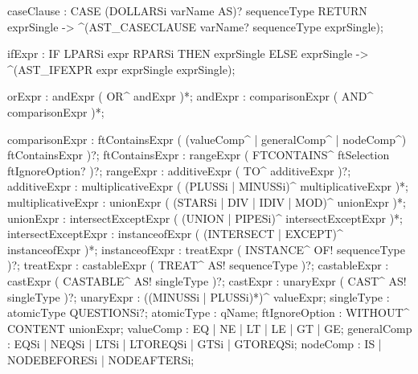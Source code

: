     caseClause : CASE (DOLLARSi varName AS)? sequenceType RETURN exprSingle
                -> ^(AST_CASECLAUSE varName? sequenceType exprSingle);

  ifExpr : IF LPARSi expr RPARSi THEN exprSingle ELSE exprSingle
           -> ^(AST_IFEXPR expr exprSingle exprSingle);

  orExpr : andExpr ( OR^ andExpr )*;
    andExpr : comparisonExpr ( AND^ comparisonExpr )*;

comparisonExpr : ftContainsExpr ( 
                  (valueComp^ | generalComp^ | nodeComp^) 
                 ftContainsExpr )?;
  ftContainsExpr : rangeExpr ( FTCONTAINS^ ftSelection ftIgnoreOption? )?;
    rangeExpr : additiveExpr ( TO^ additiveExpr )?;
      additiveExpr : multiplicativeExpr 
                     ( (PLUSSi | MINUSSi)^ multiplicativeExpr )*;
        multiplicativeExpr  : unionExpr 
                              ( (STARSi | DIV | IDIV | MOD)^ unionExpr )*;
          unionExpr : intersectExceptExpr 
                      ( (UNION | PIPESi)^ intersectExceptExpr )*;
            intersectExceptExpr : instanceofExpr 
                                  ( (INTERSECT | EXCEPT)^ instanceofExpr )*;
              instanceofExpr : treatExpr ( INSTANCE^ OF! sequenceType )?;
                treatExpr : castableExpr ( TREAT^ AS! sequenceType )?;
                  castableExpr : castExpr ( CASTABLE^ AS! singleType )?;
                    castExpr : unaryExpr ( CAST^ AS! singleType )?;
                      unaryExpr : ((MINUSSi | PLUSSi)*)^ valueExpr;
                      singleType : atomicType QUESTIONSi?;
                        atomicType : qName;
  ftIgnoreOption : WITHOUT^ CONTENT unionExpr;
  valueComp : EQ | NE | LT | LE | GT | GE;
  generalComp : EQSi | NEQSi | LTSi | LTOREQSi | GTSi | GTOREQSi;
  nodeComp : IS | NODEBEFORESi | NODEAFTERSi;

